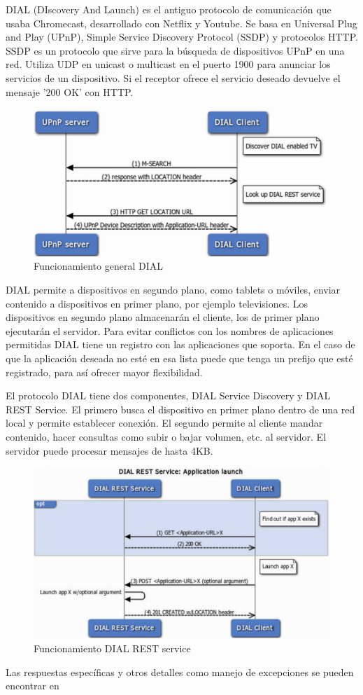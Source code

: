 DIAL (DIscovery And Launch) es el antiguo protocolo de comunicación que usaba Chromecast, desarrollado con Netflix y Youtube.
Se basa en Universal Plug and Play (UPnP), Simple Service Discovery Protocol (SSDP) y protocolos HTTP.
SSDP es un protocolo que sirve para la búsqueda de dispositivos UPnP en una red. Utiliza UDP en unicast o multicast en el puerto 1900 para anunciar los servicios de un dispositivo. Si el receptor ofrece el servicio deseado devuelve el mensaje '200 OK' con HTTP.


\begin{figure}[H]
	\centering
	\includegraphics[scale=0.32]{./Imagenes/dial.png}
	\caption{Funcionamiento general DIAL}
	\label{fig:DIAL}
\end{figure}


DIAL permite a dispositivos en segundo plano, como tablets o móviles, enviar contenido a dispositivos en primer plano, por ejemplo televisiones.
Los dispositivos en segundo plano almacenarán el cliente, los de primer plano ejecutarán el servidor.
Para evitar conflictos con los nombres de aplicaciones permitidas DIAL tiene un registro con las aplicaciones que soporta. En el caso de que la aplicación deseada no esté en esa lista puede que tenga un prefijo que esté registrado, para así ofrecer mayor flexibilidad.

El protocolo DIAL tiene dos componentes, DIAL Service Discovery y DIAL REST Service.
El primero busca el dispositivo en primer plano dentro de una red local y permite establecer conexión.
El segundo permite al cliente mandar contenido, hacer consultas como subir o bajar volumen, etc. al servidor.
El servidor puede procesar mensajes de hasta 4KB.

\begin{figure}[H]
	\centering
	\includegraphics[scale=0.5]{./Imagenes/dialrest.png}
	\caption{Funcionamiento DIAL REST service}
	\label{fig:DIAL}
\end{figure}


Las respuestas específicas y otros detalles como manejo de excepciones se pueden encontrar en \cite{dial}
